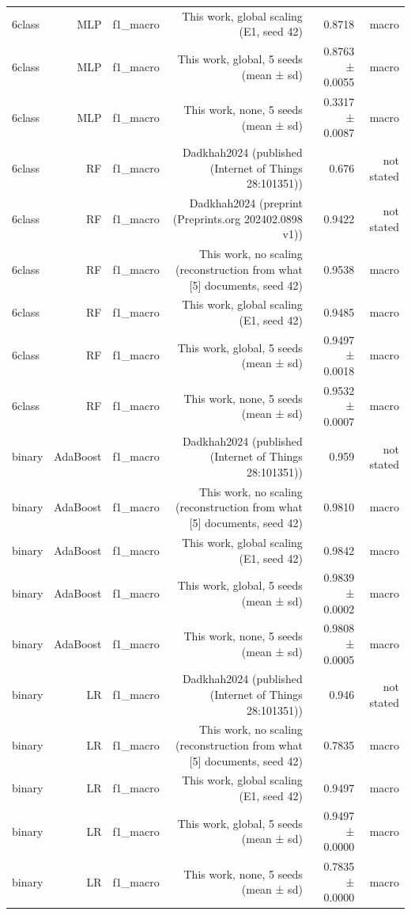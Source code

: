 \begin{table}[htbp]
{\begin{tabular}{lrrrrr}
6class & MLP & f1\_macro & This work, global scaling (E1, seed 42) & 0.8718 & macro \\
6class & MLP & f1\_macro & This work, global, 5 seeds (mean ± sd) & 0.8763 ± 0.0055 & macro \\
6class & MLP & f1\_macro & This work, none, 5 seeds (mean ± sd) & 0.3317 ± 0.0087 & macro \\
6class & RF & f1\_macro & Dadkhah2024 (published (Internet of Things 28:101351)) & 0.676 & not stated \\
6class & RF & f1\_macro & Dadkhah2024 (preprint (Preprints.org 202402.0898 v1)) & 0.9422 & not stated \\
6class & RF & f1\_macro & This work, no scaling (reconstruction from what [5] documents, seed 42) & 0.9538 & macro \\
6class & RF & f1\_macro & This work, global scaling (E1, seed 42) & 0.9485 & macro \\
6class & RF & f1\_macro & This work, global, 5 seeds (mean ± sd) & 0.9497 ± 0.0018 & macro \\
6class & RF & f1\_macro & This work, none, 5 seeds (mean ± sd) & 0.9532 ± 0.0007 & macro \\
binary & AdaBoost & f1\_macro & Dadkhah2024 (published (Internet of Things 28:101351)) & 0.959 & not stated \\
binary & AdaBoost & f1\_macro & This work, no scaling (reconstruction from what [5] documents, seed 42) & 0.9810 & macro \\
binary & AdaBoost & f1\_macro & This work, global scaling (E1, seed 42) & 0.9842 & macro \\
binary & AdaBoost & f1\_macro & This work, global, 5 seeds (mean ± sd) & 0.9839 ± 0.0002 & macro \\
binary & AdaBoost & f1\_macro & This work, none, 5 seeds (mean ± sd) & 0.9808 ± 0.0005 & macro \\
binary & LR & f1\_macro & Dadkhah2024 (published (Internet of Things 28:101351)) & 0.946 & not stated \\
binary & LR & f1\_macro & This work, no scaling (reconstruction from what [5] documents, seed 42) & 0.7835 & macro \\
binary & LR & f1\_macro & This work, global scaling (E1, seed 42) & 0.9497 & macro \\
binary & LR & f1\_macro & This work, global, 5 seeds (mean ± sd) & 0.9497 ± 0.0000 & macro \\
binary & LR & f1\_macro & This work, none, 5 seeds (mean ± sd) & 0.7835 ± 0.0000 & macro \\

\end{tabular}}
\end{table}
